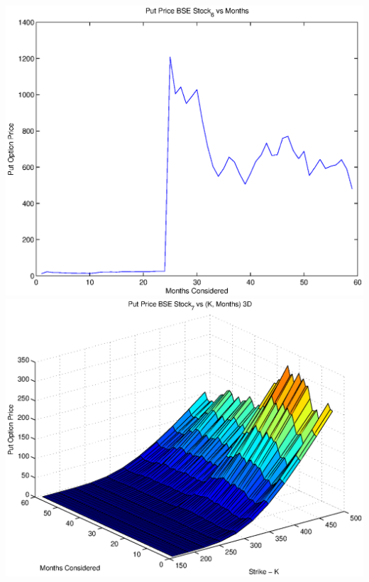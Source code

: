 \documentclass{article}
\begin{document}
\includegraphics[width=\textwidth]{Put_Price_BSE_Stock_6_vs_Months} \\

\includegraphics[width=\textwidth]{Put_Price_BSE_Stock_7_vs_(K,_Months)_3D} \\
\end{document}
